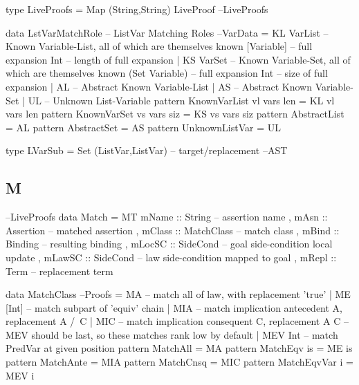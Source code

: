 \begin{code}
type LiveProofs = Map (String,String) LiveProof                   --LiveProofs
\end{code}

\begin{code}
data LstVarMatchRole -- ListVar Matching Roles                       --VarData
 = KL VarList        -- Known Variable-List, all of which are themselves known
      [Variable]     -- full expansion
      Int            -- length of full expansion
 | KS VarSet         -- Known Variable-Set, all of which are themselves known
      (Set Variable) -- full expansion
      Int            -- size of full expansion
 | AL                -- Abstract Known Variable-List
 | AS                -- Abstract Known Variable-Set
 | UL                -- Unknown List-Variable
pattern KnownVarList vl vars len  =  KL vl vars len
pattern KnownVarSet  vs vars siz  =  KS vs vars siz
pattern AbstractList              =  AL
pattern AbstractSet               =  AS
pattern UnknownListVar            =  UL
\end{code}

\begin{code}
type LVarSub = Set (ListVar,ListVar) -- target/replacement              --AST
\end{code}

\subsection{M}

\begin{code}                                                      --LiveProofs
data Match
 = MT { mName  ::  String     -- assertion name
      , mAsn   ::  Assertion  -- matched assertion
      , mClass ::  MatchClass -- match class
      , mBind  ::  Binding    -- resulting binding
      , mLocSC ::  SideCond   -- goal side-condition local update
      , mLawSC ::  SideCond   -- law side-condition mapped to goal
      , mRepl  ::  Term       -- replacement term
      }
\end{code}

\begin{code}
data MatchClass                                                       --Proofs
  = MA       -- match all of law, with replacement 'true'
  | ME [Int] -- match subpart of 'equiv' chain
  | MIA      -- match implication antecedent A, replacement A /\ C
  | MIC      -- match implication consequent C, replacement A \/ C
  -- MEV should be last, so these matches rank low by default
  | MEV Int  -- match PredVar at given position
pattern MatchAll       = MA
pattern MatchEqv is    = ME is
pattern MatchAnte      = MIA
pattern MatchCnsq      = MIC
pattern MatchEqvVar i  = MEV i
\end{code}

